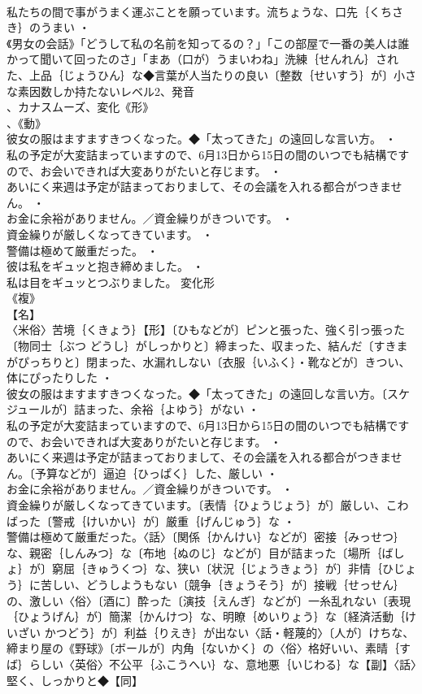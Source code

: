 \documentclass[8pt]{extreport}
\begin{document}
\begin{CJK}{UTF8}{min}
\\	私たちの間で事がうまく運ぶことを願っています。流ちょうな、口先｛くちさき｝のうまい ・
\\	《男女の会話》「どうして私の名前を知ってるの？」「この部屋で一番の美人は誰かって聞いて回ったのさ」「まあ（口が）うまいわね」洗練｛せんれん｝された、上品｛じょうひん｝な◆言葉が人当たりの良い〔整数｛せいすう｝が〕小さな素因数しか持たないレベル2、発音
\\	、カナスムーズ、変化《形》
\\	、《動》
\\	彼女の服はますますきつくなった。◆「太ってきた」の遠回しな言い方。 ・
\\	私の予定が大変詰まっていますので、6月13日から15日の間のいつでも結構ですので、お会いできれば大変ありがたいと存じます。 ・
\\	あいにく来週は予定が詰まっておりまして、その会議を入れる都合がつきません。 ・
\\	お金に余裕がありません。／資金繰りがきついです。 ・
\\	資金繰りが厳しくなってきています。 ・
\\	警備は極めて厳重だった。 ・
\\	彼は私をギュッと抱き締めました。 ・
\\	私は目をギュッとつぶりました。	変化形 
\\	《複》
\\	【名】
\\	〈米俗〉苦境｛くきょう｝【形】〔ひもなどが〕ピンと張った、強く引っ張った〔物同士｛ぶつ どうし｝がしっかりと〕締まった、収まった、結んだ〔すきまがぴっちりと〕閉まった、水漏れしない〔衣服｛いふく｝・靴などが〕きつい、体にぴったりした ・
\\	彼女の服はますますきつくなった。◆「太ってきた」の遠回しな言い方。〔スケジュールが〕詰まった、余裕｛よゆう｝がない ・
\\	私の予定が大変詰まっていますので、6月13日から15日の間のいつでも結構ですので、お会いできれば大変ありがたいと存じます。 ・
\\	あいにく来週は予定が詰まっておりまして、その会議を入れる都合がつきません。〔予算などが〕逼迫｛ひっぱく｝した、厳しい ・
\\	お金に余裕がありません。／資金繰りがきついです。 ・
\\	資金繰りが厳しくなってきています。〔表情｛ひょうじょう｝が〕厳しい、こわばった〔警戒｛けいかい｝が〕厳重｛げんじゅう｝な ・
\\	警備は極めて厳重だった。〈話〉〔関係｛かんけい｝などが〕密接｛みっせつ｝な、親密｛しんみつ｝な〔布地｛ぬのじ｝などが〕目が詰まった〔場所｛ばしょ｝が〕窮屈｛きゅうくつ｝な、狭い〔状況｛じょうきょう｝が〕非情｛ひじょう｝に苦しい、どうしようもない〔競争｛きょうそう｝が〕接戦｛せっせん｝の、激しい〈俗〉〔酒に〕酔った〔演技｛えんぎ｝などが〕一糸乱れない〔表現｛ひょうげん｝が〕簡潔｛かんけつ｝な、明瞭｛めいりょう｝な〔経済活動｛けいざい かつどう｝が〕利益｛りえき｝が出ない〈話・軽蔑的〉〔人が〕けちな、締まり屋の《野球》〔ボールが〕内角｛ないかく｝の〈俗〉格好いい、素晴｛すば｝らしい〈英俗〉不公平｛ふこうへい｝な、意地悪｛いじわる｝な【副】〈話〉堅く、しっかりと◆【同】

\end{CJK}
\end{document}
